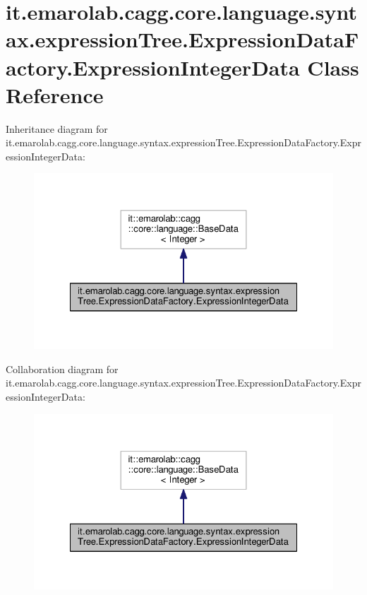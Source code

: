 \hypertarget{classit_1_1emarolab_1_1cagg_1_1core_1_1language_1_1syntax_1_1expressionTree_1_1ExpressionDataFactory_1_1ExpressionIntegerData}{\section{it.\-emarolab.\-cagg.\-core.\-language.\-syntax.\-expression\-Tree.\-Expression\-Data\-Factory.\-Expression\-Integer\-Data Class Reference}
\label{classit_1_1emarolab_1_1cagg_1_1core_1_1language_1_1syntax_1_1expressionTree_1_1ExpressionDataFactory_1_1ExpressionIntegerData}
}


Inheritance diagram for it.\-emarolab.\-cagg.\-core.\-language.\-syntax.\-expression\-Tree.\-Expression\-Data\-Factory.\-Expression\-Integer\-Data\-:\nopagebreak
\begin{figure}[H]
\begin{center}
\leavevmode
\includegraphics[width=324pt]{classit_1_1emarolab_1_1cagg_1_1core_1_1language_1_1syntax_1_1expressionTree_1_1ExpressionDataFac0ee82d4f09b94fcae15951541c0046cc}
\end{center}
\end{figure}


Collaboration diagram for it.\-emarolab.\-cagg.\-core.\-language.\-syntax.\-expression\-Tree.\-Expression\-Data\-Factory.\-Expression\-Integer\-Data\-:\nopagebreak
\begin{figure}[H]
\begin{center}
\leavevmode
\includegraphics[width=324pt]{classit_1_1emarolab_1_1cagg_1_1core_1_1language_1_1syntax_1_1expressionTree_1_1ExpressionDataFacffc911d7739912b76aa260ad6a6a5409}
\end{center}
\end{figure}
